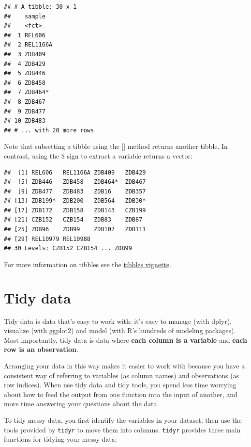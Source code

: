 \documentclass[]{book}
\newenvironment{Shaded}{\begin{snugshade}}{\end{snugshade}}
\newcommand{\NormalTok}[1]{#1}
\newcommand{\OperatorTok}[1]{\textcolor[rgb]{0.81,0.36,0.00}{\textbf{#1}}}
\begin{document}
\begin{verbatim}
## # A tibble: 30 x 1
##    sample  
##    <fct>   
##  1 REL606  
##  2 REL1166A
##  3 ZDB409  
##  4 ZDB429  
##  5 ZDB446  
##  6 ZDB458  
##  7 ZDB464* 
##  8 ZDB467  
##  9 ZDB477  
## 10 ZDB483  
## # ... with 20 more rows
\end{verbatim}

Note that subsetting a tibble using the {[}{]} method returns another tibble. In contrast, using the \$ sign to extract a variable returns a vector:

\begin{Shaded}
\end{Shaded}

\begin{verbatim}
##  [1] REL606   REL1166A ZDB409   ZDB429  
##  [5] ZDB446   ZDB458   ZDB464*  ZDB467  
##  [9] ZDB477   ZDB483   ZDB16    ZDB357  
## [13] ZDB199*  ZDB200   ZDB564   ZDB30*  
## [17] ZDB172   ZDB158   ZDB143   CZB199  
## [21] CZB152   CZB154   ZDB83    ZDB87   
## [25] ZDB96    ZDB99    ZDB107   ZDB111  
## [29] REL10979 REL10988
## 30 Levels: CZB152 CZB154 ... ZDB99
\end{verbatim}

For more information on tibbles see the \href{https://cran.r-project.org/web/packages/tibble/vignettes/tibble.html}{tibbles vignette}.

\hypertarget{tidy-data}{%
\section{Tidy data}\label{tidy-data}}

Tidy data is data that's easy to work with: it's easy to manage (with dplyr), visualize (with ggplot2) and model (with R's hundreds of modeling packages). Most importantly, tidy data is data where \textbf{each column is a variable} and \textbf{each row is an observation}.

Arranging your data in this way makes it easier to work with because you have a consistent way of referring to variables (as column names) and observations (as row indices). When use tidy data and tidy tools, you spend less time worrying about how to feed the output from one function into the input of another, and more time answering your questions about the data.

To tidy messy data, you first identify the variables in your dataset, then use the tools provided by \texttt{tidyr} to move them into columns. \texttt{tidyr} provides three main functions for tidying your messy data:
\end{document}
